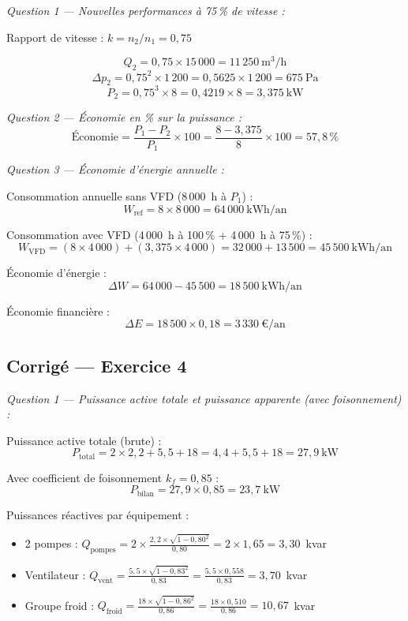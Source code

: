 \textit{Question 1 — Nouvelles performances à 75\,\% de vitesse :}

Rapport de vitesse : $k = n_2/n_1 = 0{,}75$

\[
  Q_2 = 0{,}75 \times 15\,000 = \boxed{11\,250~\text{m}^3/\text{h}}
\]
\[
  \Delta p_2 = 0{,}75^2 \times 1\,200 = 0{,}5625 \times 1\,200 = \boxed{675~\text{Pa}}
\]
\[
  P_2 = 0{,}75^3 \times 8 = 0{,}4219 \times 8 = \boxed{3{,}375~\text{kW}}
\]

\textit{Question 2 — Économie en \% sur la puissance :}
\[
  \text{Économie} = \frac{P_1 - P_2}{P_1} \times 100 = \frac{8 - 3{,}375}{8} \times 100 = \boxed{57{,}8\,\%}
\]

\textit{Question 3 — Économie d'énergie annuelle :}

Consommation annuelle sans VFD (8\,000~h à $P_1$) :
\[
  W_{\text{ref}} = 8 \times 8\,000 = 64\,000~\text{kWh/an}
\]

Consommation avec VFD (4\,000~h à 100\,\% + 4\,000~h à 75\,\%) :
\[
  W_{\text{VFD}} = (8 \times 4\,000) + (3{,}375 \times 4\,000) = 32\,000 + 13\,500 = 45\,500~\text{kWh/an}
\]

Économie d'énergie :
\[
  \Delta W = 64\,000 - 45\,500 = \boxed{18\,500~\text{kWh/an}}
\]

Économie financière :
\[
  \Delta E = 18\,500 \times 0{,}18 = \boxed{3\,330~\text{€/an}}
\]

\subsection*{Corrigé — Exercice 4}

\textit{Question 1 — Puissance active totale et puissance apparente (avec foisonnement) :}

Puissance active totale (brute) :
\[
  P_{\text{total}} = 2 \times 2{,}2 + 5{,}5 + 18 = 4{,}4 + 5{,}5 + 18 = 27{,}9~\text{kW}
\]

Avec coefficient de foisonnement $k_f = 0{,}85$ :
\[
  P_{\text{bilan}} = 27{,}9 \times 0{,}85 = \boxed{23{,}7~\text{kW}}
\]

Puissances réactives par équipement :
\begin{itemize}
  \item 2 pompes : $Q_{\text{pompes}} = 2 \times \frac{2{,}2 \times \sqrt{1-0{,}80^2}}{0{,}80} = 2 \times 1{,}65 = 3{,}30$~kvar
  \item Ventilateur : $Q_{\text{vent}} = \frac{5{,}5 \times \sqrt{1-0{,}83^2}}{0{,}83} = \frac{5{,}5 \times 0{,}558}{0{,}83} = 3{,}70$~kvar
  \item Groupe froid : $Q_{\text{froid}} = \frac{18 \times \sqrt{1-0{,}86^2}}{0{,}86} = \frac{18 \times 0{,}510}{0{,}86} = 10{,}67$~kvar
\end{itemize}

